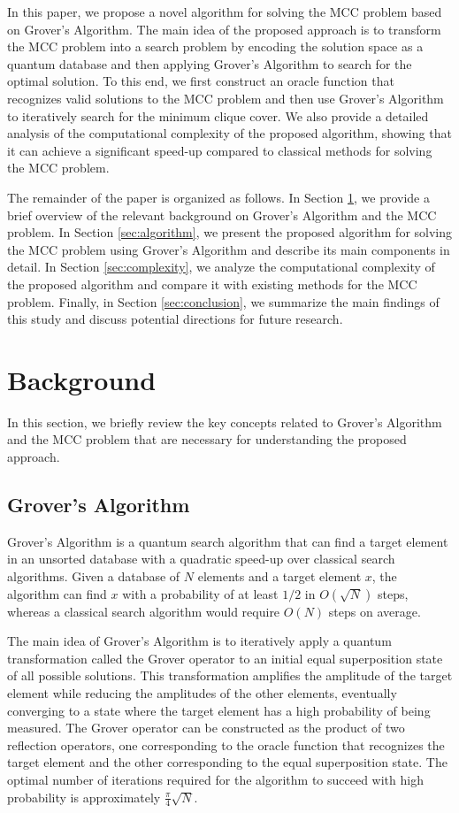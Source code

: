 In this paper, we propose a novel algorithm for solving the MCC problem based on Grover's Algorithm. The main idea of the proposed approach is to transform the MCC problem into a search problem by encoding the solution space as a quantum database and then applying Grover's Algorithm to search for the optimal solution. To this end, we first construct an oracle function that recognizes valid solutions to the MCC problem and then use Grover's Algorithm to iteratively search for the minimum clique cover. We also provide a detailed analysis of the computational complexity of the proposed algorithm, showing that it can achieve a significant speed-up compared to classical methods for solving the MCC problem.

The remainder of the paper is organized as follows. In Section \ref{sec:background}, we provide a brief overview of the relevant background on Grover's Algorithm and the MCC problem. In Section \ref{sec:algorithm}, we present the proposed algorithm for solving the MCC problem using Grover's Algorithm and describe its main components in detail. In Section \ref{sec:complexity}, we analyze the computational complexity of the proposed algorithm and compare it with existing methods for the MCC problem. Finally, in Section \ref{sec:conclusion}, we summarize the main findings of this study and discuss potential directions for future research.

\section{Background}\label{sec:background}

In this section, we briefly review the key concepts related to Grover's Algorithm and the MCC problem that are necessary for understanding the proposed approach.

\subsection{Grover's Algorithm}

Grover's Algorithm \cite{grover1996} is a quantum search algorithm that can find a target element in an unsorted database with a quadratic speed-up over classical search algorithms. Given a database of $N$ elements and a target element $x$, the algorithm can find $x$ with a probability of at least $1/2$ in $O(\sqrt{N})$ steps, whereas a classical search algorithm would require $O(N)$ steps on average.

The main idea of Grover's Algorithm is to iteratively apply a quantum transformation called the Grover operator to an initial equal superposition state of all possible solutions. This transformation amplifies the amplitude of the target element while reducing the amplitudes of the other elements, eventually converging to a state where the target element has a high probability of being measured. The Grover operator can be constructed as the product of two reflection operators, one corresponding to the oracle function that recognizes the target element and the other corresponding to the equal superposition state. The optimal number of iterations required for the algorithm to succeed with high probability is approximately $\frac{\pi}{4}\sqrt{N}$.

